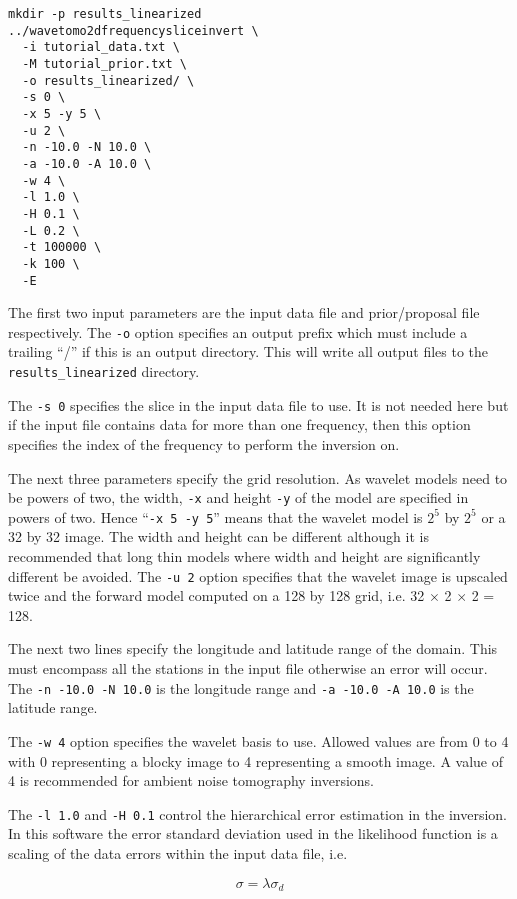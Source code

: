 \documentclass[a4paper,12pt]{article}
\begin{document}
\begin{verbatim}
mkdir -p results_linearized
../wavetomo2dfrequencysliceinvert \
  -i tutorial_data.txt \
  -M tutorial_prior.txt \
  -o results_linearized/ \
  -s 0 \
  -x 5 -y 5 \
  -u 2 \
  -n -10.0 -N 10.0 \
  -a -10.0 -A 10.0 \
  -w 4 \
  -l 1.0 \
  -H 0.1 \
  -L 0.2 \
  -t 100000 \
  -k 100 \
  -E
\end{verbatim}

The first two input parameters are the input data file and prior/proposal file respectively.
The {\tt -o} option specifies an output prefix which must include a trailing ``/'' if this
is an output directory. This will write all output files to the {\tt results\_linearized}
directory.

The {\tt -s 0} specifies the slice in the input data file to use. It is not needed here but
if the input file contains data for more than one frequency, then this option specifies
the index of the frequency to perform the inversion on.

The next three parameters specify the grid resolution. As wavelet models need to be powers
of two, the width, {\tt -x} and height {\tt -y} of the model are specified in powers of
two. Hence ``{\tt -x 5 -y 5}'' means that the wavelet model is $2^5$ by $2^5$ or a 32 by 32
image. The width and height can be different although it is recommended that long thin
models where width and height are significantly different be avoided. The {\tt -u 2} option
specifies that the wavelet image is upscaled twice and the forward model computed on a
128 by 128 grid, i.e. 32 $\times$ 2 $\times$ 2 = 128.

The next two lines specify the longitude and latitude range of the domain. This must
encompass all the stations in the input file otherwise an error will occur. The
{\tt -n -10.0 -N 10.0} is the longitude range and {\tt -a -10.0 -A 10.0} is the latitude
range.

The {\tt -w 4} option specifies the wavelet basis to use. Allowed values are from 0
to 4 with 0 representing a blocky image to 4 representing a smooth image. A value of
4 is recommended for ambient noise tomography inversions.

The {\tt -l 1.0} and {\tt -H 0.1} control the hierarchical error estimation in the inversion.
In this software the error standard deviation used in the likelihood function is a
scaling of the data errors within the input data file, i.e.

\begin{equation}
  \sigma = \lambda \sigma_d
\end{equation}
\end{document}
